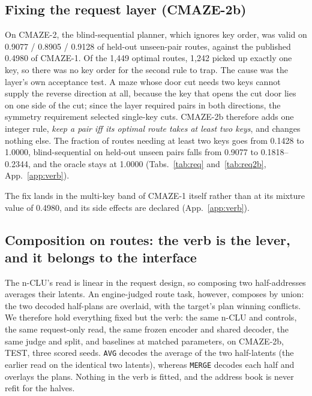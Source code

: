 \documentclass{article} %
\begin{document}
\subsection{Fixing the request layer (CMAZE-2b)}
\label{sec:req-layer}

On CMAZE-2, the blind-sequential planner, which ignores key order, was valid on 0.9077 /
0.8905 / 0.9128 of held-out unseen-pair routes, against the published 0.4980 of CMAZE-1. Of
the 1,449 optimal routes, 1,242 picked up exactly one key, so there was no key order for the
second rule to trap. %
The cause was the layer's own acceptance test. A maze whose door cut needs two keys cannot
supply the reverse direction at all, because the key that opens the cut door lies on one side
of the cut; since the layer required pairs in both directions, the symmetry requirement selected
single-key cuts. %
CMAZE-2b therefore adds one integer rule, \emph{keep a pair iff its optimal route takes at least
two keys}, and changes nothing else. The fraction of routes needing at least two keys goes from
0.1428 to 1.0000, blind-sequential on held-out unseen pairs falls from 0.9077 to 0.1818--0.2344,
and the oracle stays at 1.0000 (Tabs.~\ref{tab:req} and~\ref{tab:req2b}, App.~\ref{app:verb}). %

The fix lands in the multi-key band of CMAZE-1 itself rather than at its mixture value of 0.4980, and %
its side effects are declared (App.~\ref{app:verb}).

\subsection{Composition on routes: the verb is the lever, and it belongs to the interface}
\label{sec:verb}

The n-CLU's read is linear in the request design, so composing two half-addresses averages
their latents. An engine-judged route task, however, composes by union: the two decoded half-plans
are overlaid, with the target's plan winning conflicts. We therefore hold everything fixed but
the verb: the same n-CLU and controls, the same request-only read, the same frozen encoder and
shared decoder, the same judge and split, and baselines at matched parameters, on CMAZE-2b, TEST,
three scored seeds. \texttt{AVG} decodes the average of the two half-latents (the earlier read
on the identical two latents), whereas \texttt{MERGE} decodes each half and overlays the plans.
Nothing in the verb is fitted, and the address book is never refit for the halves. %
\end{document}
